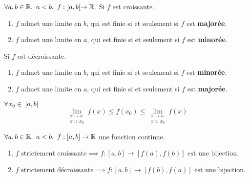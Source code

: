 \begin{theorem}
	$\forall a, b \in \mathbb{R},\ a < b,\ f :\ ]a, b[ \to \mathbb{R}$. 
	Si $f$ est croissante.
	\begin{enumerate}
		\item $f$ admet une limite en $b$, qui est finie si et seulement si $f$ est \textbf{majorée}.
		\item $f$ admet une limite en $a$, qui est finie si et seulement si $f$ est \textbf{minorée}.
	\end{enumerate}
	Si $f$ est décroissante.
	\begin{enumerate}
		\item $f$ admet une limite en $b$, qui est finie si et seulement si $f$ est \textbf{minorée}.
		\item $f$ admet une limite en $a$, qui est finie si et seulement si $f$ est \textbf{majorée}.
	\end{enumerate}
	$\forall x_0 \in \ ]a, b[$
	\[ \lim_{\substack{x \to a \\ x < x_0}} f(x) \leq f(x_0) \leq \lim_{\substack{x \to a \\ x > x_0}} f(x) \]
\end{theorem}

\begin{theorem}
	$\forall a, b \in \mathbb{R},\ a < b,\ f : [a, b] \to \mathbb{R}$ une fonction continue.
	\begin{enumerate}
	    \item $ f \text{ strictement croissante} \implies f : [a, b] \to [f(a), f(b)] \text{ est une bijection} $.
            \item $ f \text{ strictement décroissante} \implies f : [a, b] \to [f(b), f(a)] \text{ est une bijection} $.
	\end{enumerate}
\end{theorem}